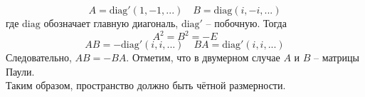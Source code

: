 \documentclass[12pt]{article}
\begin{document}
\begin{enumerate}
\begin{equation}
    A=\text{diag}'(1,-1,...)\quad B=\text{diag}(i, -i, ...)
\end{equation}
где $\text{diag}$ обозначает главную диагональ, $\text{diag}'$ -- побочную. Тогда
\begin{equation}
    A^2=B^2=-E
\end{equation}
\begin{equation}
    AB=-\text{diag}'(i,i,...)\quad BA=\text{diag}'(i,i,...)
\end{equation}
Следовательно, $AB=-BA$. Отметим, что в двумерном случае $A$ и $B$ -- матрицы Паули.\\
Таким образом, пространство должно быть чётной размерности.\\
\end{enumerate}
\end{document}
